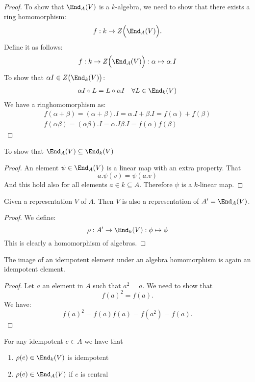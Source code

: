 \begin{proof}
To show that $\End_A(V)$ is a \(k\)-algebra, we need to show that there exists a ring homomorphism:
\[
f : k\rightarrow Z\Big(\End_A(V)\Big).
\]
Define it as follows:
\[
f : k\rightarrow Z\Big(\End_A(V)\Big) : \alpha  \mapsto  \alpha .I
\]
To show that \(\alpha I\in Z\big(\End_{k}(V)\big)\):
\begin{align*}
\alpha I\circ L=L\circ \alpha I &&\forall L\in \End_{k}(V)
\end{align*}
We have a ringhomomorphism as:
\begin{gather*}
f(\alpha +\beta )=(\alpha +\beta ).I=\alpha .I+\beta .I=f(\alpha )+f(\beta ) \\
f(\alpha \beta )=(\alpha \beta ).I=\alpha .I\beta .I=f(\alpha )f(\beta )
\end{gather*}
\end{proof}

\begin{prop}
To show that \(\End_A(V)\subseteq \End_{k}(V)\)
\end{prop}

\begin{proof}
An element \(\psi \in \End_A(V)\) is a linear map with an extra property. That
\[
a.\psi (v)=\psi (a.v)
\]
And this hold also for all elements \(a\in k\subseteq A\). Therefore \(\psi \) is a \(k\)-linear map.
\end{proof}


\begin{prop}
Given a representation \(V\) of \(A\). Then \(V\) is also a representation of \(A'=\End_{A} (V)\).

\end{prop}

\begin{proof}
We define:
\[\rho : A' \rightarrow  \End_{k} (V) : \phi  \mapsto  \phi \]
This is clearly a homomorphism of algebras.
\end{proof}

\begin{prop}
The image of an idempotent element under an algebra homomorphism is again an idempotent element.
\end{prop}

\begin{proof}
Let \(a\) an element in \(A\) such that \(a^{2} =a\). We need to show that
\[
f(a)^2=f(a).
\]
We have:
\[
f(a)^2=f(a)f(a)=f(a^2)=f(a).
\]
\end{proof}

\begin{prop}
For any idempotent \(e\in A\) we have that

\begin{enumerate}
  \item \(\rho (e)\in \End_{k}(V)\) is idempotent
  \item \(\rho (e)\in \End_A(V)\) if \(e\) is central
\end{enumerate}

\end{prop}

